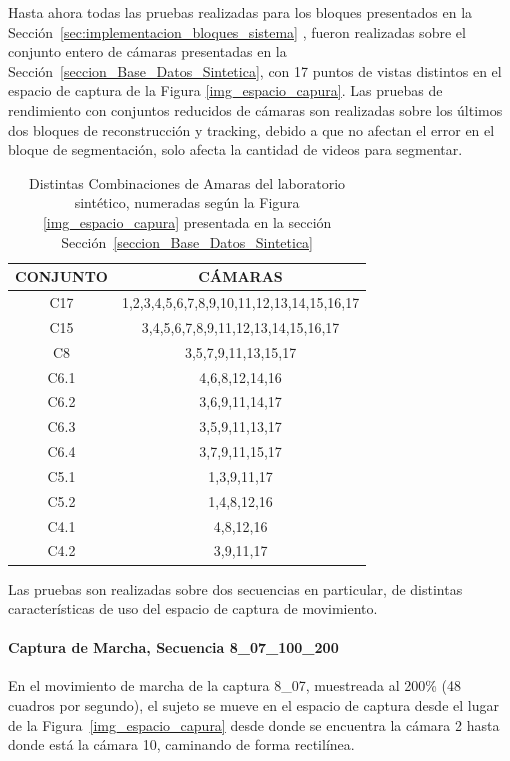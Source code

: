 Hasta ahora todas las pruebas realizadas para los bloques presentados en la Sección~\ref{sec:implementacion_bloques_sistema} , fueron realizadas sobre el conjunto entero de cámaras presentadas en la Sección~\ref{seccion_Base_Datos_Sintetica}, con 17 puntos de vistas distintos en el espacio de captura de la Figura \ref{img_espacio_capura}. Las pruebas de rendimiento con conjuntos reducidos de cámaras son realizadas sobre los últimos dos bloques de reconstrucción y tracking, debido a que no afectan el error en el bloque de segmentación, solo afecta la cantidad de videos para segmentar.

\begin{table}[h]
\centering
\begin{tabular}{|c|c|}
\hline
\textbf{CONJUNTO} & \textbf{CÁMARAS} \\ \hline
C17 & 1,2,3,4,5,6,7,8,9,10,11,12,13,14,15,16,17 \\ \hline
C15 & 3,4,5,6,7,8,9,11,12,13,14,15,16,17 \\ \hline
C8 & 3,5,7,9,11,13,15,17 \\ \hline
C6.1 & 4,6,8,12,14,16 \\ \hline
C6.2 & 3,6,9,11,14,17 \\ \hline
C6.3 & 3,5,9,11,13,17 \\ \hline
C6.4 & 3,7,9,11,15,17 \\ \hline
C5.1 & 1,3,9,11,17 \\ \hline
C5.2 & 1,4,8,12,16 \\ \hline
C4.1 & 4,8,12,16 \\ \hline
C4.2 & 3,9,11,17 \\ \hline
\end{tabular}
\caption{Distintas Combinaciones de Amaras del laboratorio sintético, numeradas según la Figura \ref{img_espacio_capura} presentada en la sección Sección~\ref{seccion_Base_Datos_Sintetica} }
\end{table}

Las pruebas son realizadas sobre dos secuencias en particular, de distintas características de uso del espacio de captura de movimiento.

\paragraph{Captura de Marcha, Secuencia 8\_07\_100\_200}

En el movimiento de marcha de la captura 8\_07, muestreada al 200\% (48 cuadros por segundo), el sujeto se mueve en el espacio de captura desde el lugar de la Figura~\ref{img_espacio_capura} desde donde se encuentra la cámara 2 hasta donde está la cámara 10, caminando de forma rectilínea.

